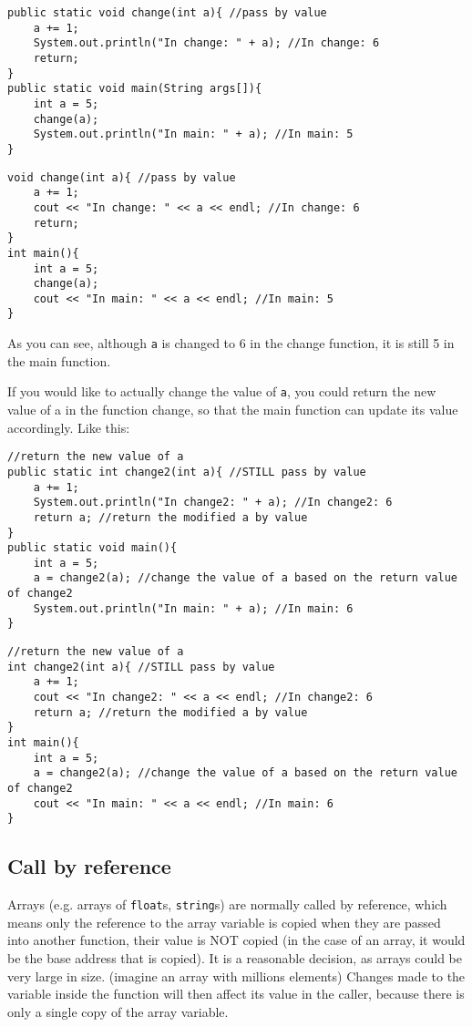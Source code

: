 \if{}
\begin{lstlisting}
public static void change(int a){ //pass by value
    a += 1;
    System.out.println("In change: " + a); //In change: 6
    return;
}
public static void main(String args[]){
    int a = 5;
    change(a);
    System.out.println("In main: " + a); //In main: 5
}
\end{lstlisting}
\else
\begin{lstlisting}
void change(int a){ //pass by value
    a += 1;
    cout << "In change: " << a << endl; //In change: 6
    return;
}
int main(){
    int a = 5;
    change(a);
    cout << "In main: " << a << endl; //In main: 5
}
\end{lstlisting}
\fi

As you can see, although \texttt{a} is changed to 6 in the change function, it is still 5 in the main function. 
\vspace{6mm}

If you would like to actually change the value of \texttt{a}, you could return the new value of a in the function change, so that the main function can update its value accordingly. Like this:

\if{}
\begin{lstlisting}
//return the new value of a
public static int change2(int a){ //STILL pass by value
    a += 1;
    System.out.println("In change2: " + a); //In change2: 6
    return a; //return the modified a by value
}
public static void main(){
    int a = 5;
    a = change2(a); //change the value of a based on the return value of change2
    System.out.println("In main: " + a); //In main: 6
}
\end{lstlisting}
\else
\begin{lstlisting}
//return the new value of a
int change2(int a){ //STILL pass by value
    a += 1;
    cout << "In change2: " << a << endl; //In change2: 6
    return a; //return the modified a by value
}
int main(){
    int a = 5;
    a = change2(a); //change the value of a based on the return value of change2
    cout << "In main: " << a << endl; //In main: 6
}
\end{lstlisting}
\fi

\subsection{Call by reference}

Arrays (e.g. arrays of \texttt{float}s, \texttt{string}s) are normally called by reference, which means only the reference to the array variable is copied when they are passed into another function, their value is NOT copied (in the case of an array, it would be the base address that is copied). It is a reasonable decision, as arrays could be very large in size. (imagine an array with millions elements) Changes made to the variable inside the function will then affect its value in the caller, because there is only a single copy of the array variable.

